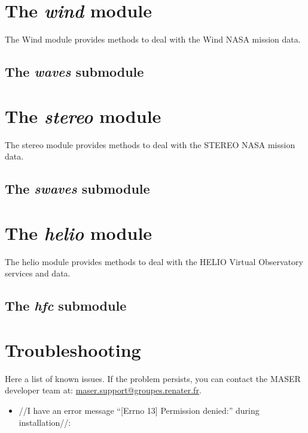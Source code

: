\documentclass[letterpaper,10pt,english]{sphinxmanual}
\begin{document}
\chapter{The \emph{wind} module}
\label{wind::doc}\label{wind:the-wind-module}
The Wind module provides methods to deal with the Wind NASA mission data.


\section{The \emph{waves} submodule}
\label{wind:the-waves-submodule}

\chapter{The \emph{stereo} module}
\label{stereo::doc}\label{stereo:the-stereo-module}
The stereo module provides methods to deal with the STEREO NASA mission data.


\section{The \emph{swaves} submodule}
\label{stereo:the-swaves-submodule}

\chapter{The \emph{helio} module}
\label{helio::doc}\label{helio:the-helio-module}
The helio module provides methods to deal with the HELIO Virtual Observatory services and data.


\section{The \emph{hfc} submodule}
\label{helio:the-hfc-submodule}

\chapter{Troubleshooting}
\label{appendices:troubleshooting}\label{appendices::doc}
Here a list of known issues.
If the problem persists, you can contact the MASER developer team at: \href{mailto:maser.support@groupes.renater.fr}{maser.support@groupes.renater.fr}.
\begin{itemize}
\item {} 
//I have an error message ``{[}Errno 13{]} Permission denied:'' during installation//:

\end{itemize}
\end{document}
